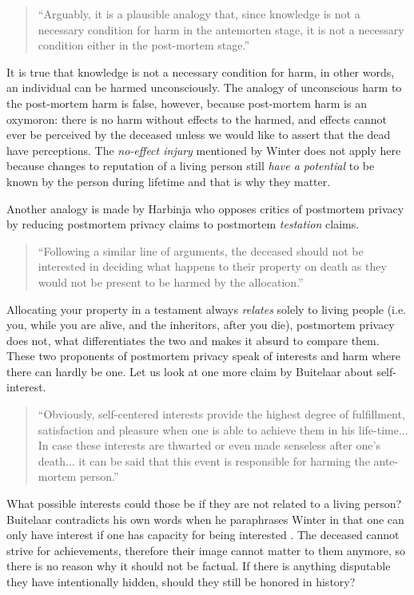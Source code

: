 \documentclass[a4paper]{article}
\begin{document}
\begin{quote}
    ``Arguably, it is a plausible analogy that, since knowledge is not a necessary condition for harm in the antemorten stage, it is not a necessary condition either in the post-mortem stage.'' \cite[p. 133]{buitelaar}
\end{quote}

It is true that knowledge is not a necessary condition for harm, in other words, an individual can be harmed unconsciously.
The analogy of unconscious harm to the post-mortem harm is false, however, because post-mortem harm is an oxymoron: there is no harm without effects to the harmed, and effects cannot ever be perceived by the deceased unless we would like to assert that the dead have perceptions. The \textit{no-effect injury} \cite{winter} mentioned by Winter does not apply here because changes to reputation of a living person still \emph{have a potential} to be known by the person during lifetime and that is why they matter.

Another analogy is made by Harbinja who opposes critics of postmortem privacy by reducing postmortem privacy claims to postmortem \textit{testation} claims.

\begin{quote}
    ``Following a similar line of arguments, the deceased should not be interested in deciding what happens to their property on death as they would not be present to be harmed by the allocation.'' \cite[p. 32]{harbinja2}
\end{quote}

Allocating your property in a testament always \emph{relates} solely to living people (i.e. you, while you are alive, and the inheritors, after you die), postmortem privacy does not, what differentiates the two and makes it absurd to compare them. These two proponents of postmortem privacy speak of interests and harm where there can hardly be one. Let us look at one more claim by Buitelaar about self-interest.

\begin{quote}
``Obviously, self-centered interests provide the highest degree of fulfillment, satisfaction and pleasure when one is able to achieve them in his life-time...
In case these interests are thwarted or even made senseless after one's death... it can be said that this event is responsible for harming the ante-mortem person.'' \cite[p. 133]{buitelaar}
\end{quote}

\noindent What possible interests could those be if they are not related to a living person? Buitelaar contradicts his own words when he paraphrases Winter in that one can only have interest if one has capacity for being interested \cite{buitelaar}. The deceased cannot strive for achievements, therefore their image cannot matter to them anymore, so there is no reason why it should not be factual. If there is anything disputable they have intentionally hidden, should they still be honored in history?
\end{document}
